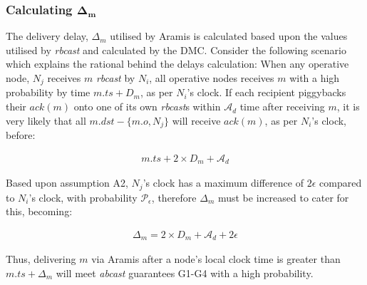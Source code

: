         \subsubsection*{Calculating $\boldsymbol{\Delta_m}$    }
%        
%		
		The delivery delay, $\Delta_m$ utilised by \textsf{Aramis} is calculated based upon the values utilised by \emph{rbcast} and calculated by the DMC.  Consider the following scenario which explains the rational behind the delays calculation: When any operative node, $N_j$ receives $m$ \emph{rbcast} by $N_i$, all operative nodes receives $m$ with a high probability by time $m.ts + D_m$, as per $N_i$'s clock.  If each recipient piggybacks their $ack(m)$ onto one of its own \emph{rbcast}s within $\mathcal{A}_d$ time after receiving $m$, it is very likely that all $m.dst - \{m.o, N_j\}$ will receive $ack(m)$, as per $N_i$'s clock, before:
		
		\begin{equation*}
		    \begin{aligned}
		        m.ts + 2\times{D_m} + \mathcal{A}_d
		    \end{aligned}
		\end{equation*}
		 
		 Based upon assumption A2, $N_j$'s clock has a maximum difference of $2\epsilon$ compared to $N_i$'s clock, with  probability $\mathcal{P}_\epsilon$, therefore $\Delta_m$ must be increased to cater for this, becoming:
		
        \begin{equation*}
		    \begin{aligned}
		        \Delta_m = 2 \times D_m + \mathcal{A}_d + 2\epsilon
		    \end{aligned}
		\end{equation*}		
		
		Thus, delivering $m$ via \textsf{Aramis} after a node's local clock time is greater than $m.ts + \Delta_m$ will meet \emph{abcast} guarantees G1-G4 with a high probability.
			    
